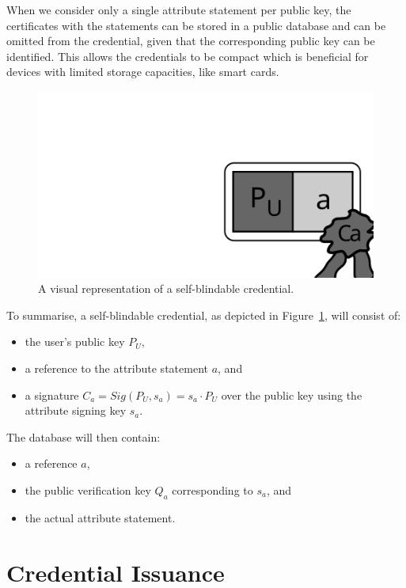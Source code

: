 When we consider only a single attribute statement per public key, the
certificates with the statements can be stored in a public database and can be
omitted from the credential, given that the corresponding public key can be
identified. This allows the credentials to be compact which is beneficial for
devices with limited storage capacities, like smart cards.

\begin{figure}[h]
  \centering
  \includegraphics[scale=.45]{images/sbc-credential}
  \caption{A visual representation of a self-blindable credential.}
  \label{fig:SBC-credential}
\end{figure}

\noindent To summarise, a self-blindable credential, as depicted in
Figure~\ref{fig:SBC-credential}, will consist of:
\begin{itemize}
  \item the user's public key $P_U$,
  \item a reference to the attribute statement $a$, and
  \item a signature $C_a = Sig(P_U, s_a) = s_a \cdot P_U$ over the public key
    using the attribute signing key $s_a$.
\end{itemize}
The database will then contain:
\begin{itemize}
  \item a reference $a$,
  \item the public verification key $Q_a$ corresponding to $s_a$, and
  \item the actual attribute statement.
\end{itemize}

\section{Credential Issuance}

